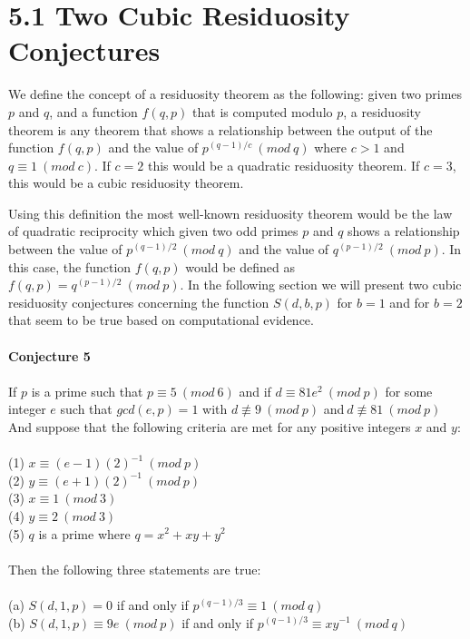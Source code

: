 \documentclass[final,letterpaper,oneside,10pt]{article}
\begin{document}
\section*{5.1 Two Cubic Residuosity Conjectures }

We define the concept of a residuosity theorem as the following: given two primes $p$ and $q$, and a function $f(q,p)$ that is computed modulo $p$,
a residuosity theorem is any theorem that shows a relationship between the output of the function $f(q,p)$ and the value of $p^{(q-1)/c}~(mod~q)$
where $c>1$ and $q \equiv 1~(mod~c)$.  If $c=2$ this would be a quadratic residuosity theorem.  If $c=3$, this would be a cubic residuosity theorem.

Using this definition the most well-known residuosity theorem would be the law of quadratic reciprocity which given two odd primes $p$ and $q$ shows a
relationship between the value of $p^{(q-1)/2}~(mod~q)$ and the value of $q^{(p-1)/2}~(mod~p)$.  In this case, the function $f(q,p)$ would be 
defined as $f(q,p) = q^{(p-1)/2}~(mod~p)$.  In the following section we will present two cubic residuosity conjectures concerning the function $S(d,b,p)$
for $b=1$ and for $b=2$ that seem to be true based on computational evidence.
\\
\\
\textbf{Conjecture 5}
\\
\\
If $p$ is a prime such that $p \equiv 5~(mod~6)$ and if $d \equiv 81e^2~(mod~p)$ for some integer $e$ such that $gcd(e,p)=1$ with 
$d \not\equiv 9~(mod~p) $ and$~d \not\equiv 81~(mod~p) $
\\
And suppose that the following criteria are met for any positive integers $x$ and $y$:
\\
\\
(1) $x \equiv (e-1)(2)^{-1}~(mod~p)$
\\
(2) $y \equiv (e+1)(2)^{-1}~(mod~p)$
\\
(3) $x \equiv 1~(mod~3)$
\\
(4) $y \equiv 2~(mod~3)$
\\
(5) $q$ is a prime where $q = x^2 +xy + y^2$
\\
\\
Then the following three statements are true:
\\
\\
(a) $S(d,1,p) = 0$ if and only if $p^{(q-1)/3} \equiv 1~(mod~q)$
\\
(b) $S(d,1,p) \equiv 9e~(mod~p)$  if and only if $p^{(q-1)/3} \equiv xy^{-1}~(mod~q)$
\end{document}
